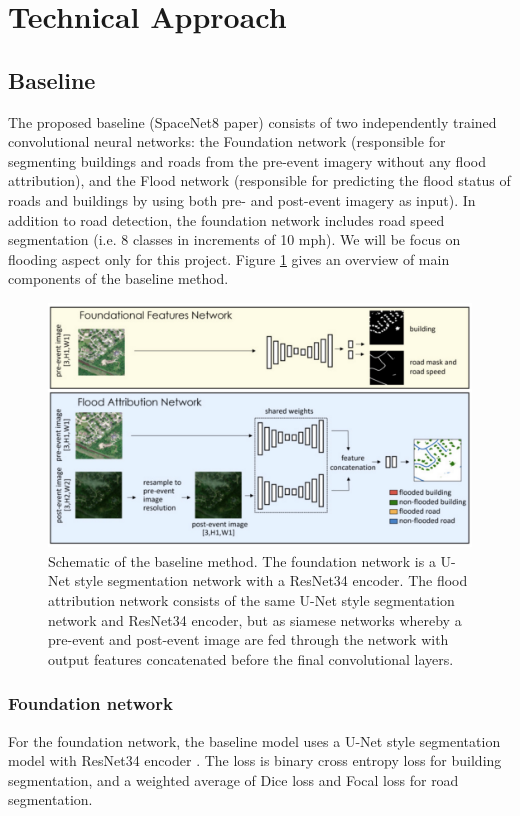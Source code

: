 \documentclass[10pt,twocolumn,letterpaper]{article}
\begin{document}
\section{Technical Approach}

\subsection{Baseline}

The proposed baseline (SpaceNet8 paper) consists of two independently trained convolutional neural networks: the Foundation network (responsible for
segmenting buildings and roads from the pre-event imagery
without any flood attribution), and the Flood network (responsible for predicting the flood status of roads and buildings by using both
pre- and post-event imagery as input). In addition to road detection, the foundation network includes road speed segmentation (i.e. 8 classes in increments of 10 mph). We will be focus on flooding aspect only for this project. Figure \ref{fig:baseline} gives an overview of main components of the baseline method.

\begin{figure}[t]
  \centering
   \includegraphics[width=1\linewidth]{figures/baseline.jpg}
   \caption{Schematic of the baseline method. The foundation network is a U-Net style segmentation network with a ResNet34 encoder. The
flood attribution network consists of the same U-Net style segmentation network and ResNet34 encoder, but as siamese networks whereby
a pre-event and post-event image are fed through the network with output features concatenated before the final convolutional layers.}
   \label{fig:baseline}
\end{figure}

\subsubsection{Foundation network}
For the foundation network, the baseline model uses a U-Net \cite{ronneberger2015unet} style segmentation model
with ResNet34 encoder \cite{he2015deep}. The loss is binary cross entropy loss for building segmentation, and a weighted average of Dice loss and Focal loss for road segmentation.
\end{document}
